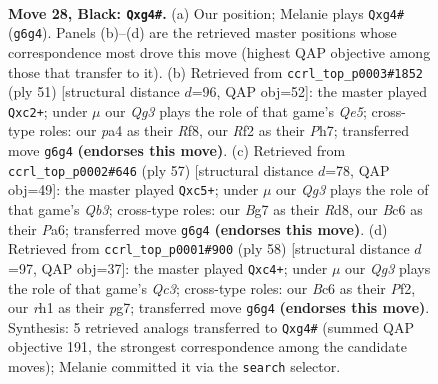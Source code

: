 \documentclass[11pt]{article}
\begin{document}
\clearpage

\begin{figure}[p]\centering
\begin{subfigure}{0.46\textwidth}\centering
\resizebox{\linewidth}{!}{%
\newchessgame
\chessboard[
  setfen={5rk1/p4pb1/2bp2q1/7p/P5QP/4p3/5r2/2R3KR b - - 3 28},
  showmover=false,
  pgfstyle=straightmove, color=movearrow, markmove={g6-g4}
]}
\caption{}
\end{subfigure}\hfill
\begin{subfigure}{0.46\textwidth}\centering
\resizebox{\linewidth}{!}{%
\newchessgame
\chessboard[
  setfen={r4rk1/p6p/4p3/2p2pP1/4q2R/8/PPQ2P2/1K5R b - - 1 26},
  showmover=false,
  pgfstyle=straightmove, color=movearrow, markmove={e4-c2}
]}
\caption{}
\end{subfigure}
\\[4pt]
\begin{subfigure}{0.46\textwidth}\centering
\resizebox{\linewidth}{!}{%
\newchessgame
\chessboard[
  setfen={3rr1k1/5p1p/pq4pB/1pQ1b3/4N3/P6P/1P4P1/3RR1K1 b - - 4 29},
  showmover=false,
  pgfstyle=straightmove, color=movearrow, markmove={b6-c5}
]}
\caption{}
\end{subfigure}\hfill
\begin{subfigure}{0.46\textwidth}\centering
\resizebox{\linewidth}{!}{%
\newchessgame
\chessboard[
  setfen={4rrk1/3p2pp/8/1p6/1Pq5/2Q3P1/5P1P/3R1RK1 w - - 2 30},
  showmover=false,
  pgfstyle=straightmove, color=movearrow, markmove={c3-c4}
]}
\caption{}
\end{subfigure}
\caption{\textbf{Move 28, Black: \texttt{Qxg4\#}.} (a) Our position; Melanie plays \texttt{Qxg4\#} (\texttt{g6g4}). Panels (b)--(d) are the retrieved master positions whose correspondence most drove this move (highest QAP objective among those that transfer to it). (b) Retrieved from \texttt{ccrl\_top\_p0003\#1852} (ply 51) [structural distance $d$=96, QAP obj=52]: the master played \texttt{Qxc2+}; under $\mu$ our \emph{Qg3} plays the role of that game's \emph{Qe5}; cross-type roles: our \emph{p}a4 as their \emph{R}f8, our \emph{R}f2 as their \emph{P}h7; transferred move \texttt{g6g4} \textbf{(endorses this move)}. (c) Retrieved from \texttt{ccrl\_top\_p0002\#646} (ply 57) [structural distance $d$=78, QAP obj=49]: the master played \texttt{Qxc5+}; under $\mu$ our \emph{Qg3} plays the role of that game's \emph{Qb3}; cross-type roles: our \emph{B}g7 as their \emph{R}d8, our \emph{B}c6 as their \emph{P}a6; transferred move \texttt{g6g4} \textbf{(endorses this move)}. (d) Retrieved from \texttt{ccrl\_top\_p0001\#900} (ply 58) [structural distance $d$=97, QAP obj=37]: the master played \texttt{Qxc4+}; under $\mu$ our \emph{Qg3} plays the role of that game's \emph{Qc3}; cross-type roles: our \emph{B}c6 as their \emph{P}f2, our \emph{r}h1 as their \emph{p}g7; transferred move \texttt{g6g4} \textbf{(endorses this move)}. Synthesis: 5 retrieved analogs transferred to \texttt{Qxg4\#} (summed QAP objective 191, the strongest correspondence among the candidate moves); Melanie committed it via the \texttt{search} selector.}
\label{fig:thought-m55}
\end{figure}
\end{document}
